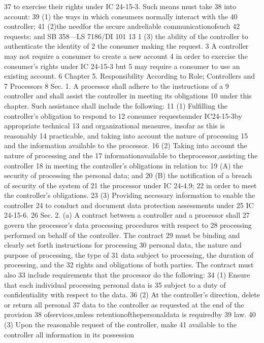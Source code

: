 37 to exercise their rights under IC 24-15-3. Such means must take
38 into account:
39 (1) the ways in which consumers normally interact with the
40 controller;
41 (2)the needfor the secure andreliable communicationofsuch
42 requests; and
SB 358—LS 7186/DI 101
13
1 (3) the ability of the controller to authenticate the identity of
2 the consumer making the request.
3 A controller may not require a consumer to create a new account
4 in order to exercise the consumer's rights under IC 24-15-3 but
5 may require a consumer to use an existing account.
6 Chapter 5. Responsibility According to Role; Controllers and
7 Processors
8 Sec. 1. A processor shall adhere to the instructions of a
9 controller and shall assist the controller in meeting its obligations
10 under this chapter. Such assistance shall include the following:
11 (1) Fulfilling the controller's obligation to respond to
12 consumer requestsunder IC24-15-3by appropriate technical
13 and organizational measures, insofar as this is reasonably
14 practicable, and taking into account the nature of processing
15 and the information available to the processor.
16 (2) Taking into account the nature of processing and the
17 informationavailable to theprocessor,assisting the controller
18 in meeting the controller's obligations in relation to:
19 (A) the security of processing the personal data; and
20 (B) the notification of a breach of security of the system of
21 the processor under IC 24-4.9;
22 in order to meet the controller's obligations.
23 (3) Providing necessary information to enable the controller
24 to conduct and document data protection assessments under
25 IC 24-15-6.
26 Sec. 2. (a) A contract between a controller and a processor shall
27 govern the processor's data processing procedures with respect to
28 processing performed on behalf of the controller. The contract
29 must be binding and clearly set forth instructions for processing
30 personal data, the nature and purpose of processing, the type of
31 data subject to processing, the duration of processing, and the
32 rights and obligations of both parties. The contract must also
33 include requirements that the processor do the following:
34 (1) Ensure that each individual processing personal data is
35 subject to a duty of confidentiality with respect to the data.
36 (2) At the controller's direction, delete or return all personal
37 data to the controller as requested at the end of the provision
38 ofservices,unless retentionofthepersonaldata is requiredby
39 law.
40 (3) Upon the reasonable request of the controller, make
41 available to the controller all information in its possession
